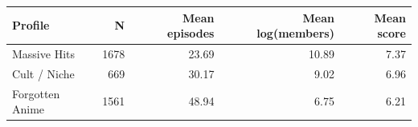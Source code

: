 \begin{tabular}{lrrrr}
\toprule
Profile & N & Mean episodes & Mean log(members) & Mean score
\\
\midrule
Massive Hits & 1678 & 23.69 & 10.89 & 7.37
\\
Cult / Niche & 669 & 30.17 & 9.02 & 6.96
\\
Forgotten Anime & 1561 & 48.94 & 6.75 & 6.21
\\
\bottomrule
\end{tabular}
